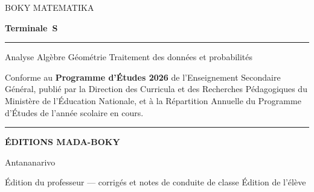 \cleardoublepage
\thispagestyle{empty}
\begingroup
\raggedright
\vspace*{3.2cm}

{\sffamily\fontsize{11}{14}\selectfont\color{bmtGris} BOKY MATEMATIKA\par}
\vspace{0.5em}
{\sffamily\bfseries\fontsize{40}{44}\selectfont\color{bmtIndigo} Terminale~S\par}
\vspace{0.9em}
{\color{bmtRaphia}\rule{4cm}{2.6pt}\par}
\vspace{1.4em}
{\sffamily\fontsize{13}{18}\selectfont
 Analyse \quad Algèbre \quad Géométrie \quad Traitement des données et probabilités\par}

\vspace{2.6cm}
{\normalsize
 Conforme au \textbf{Programme d'Études 2026} de l'Enseignement Secondaire
 Général, publié par la Direction des Curricula et des Recherches
 Pédagogiques du Ministère de l'Éducation Nationale, et à la Répartition
 Annuelle du Programme d'Études de l'année scolaire en cours.\par}

\vfill

{\color{bmtIndigo}\rule{1.4cm}{1.6pt}\par}
\vspace{0.5em}
{\sffamily\bfseries\fontsize{13}{17}\selectfont\color{bmtIndigo} ÉDITIONS MADA-BOKY\par}
\vspace{0.3em}
{\sffamily\footnotesize\color{bmtGris} Antananarivo\par}

\vspace{1.2em}
{\sffamily\footnotesize\color{bmtGris}
 \ifbmtprof Édition du professeur — corrigés et notes de conduite de classe
 \else Édition de l'élève\fi\par}
\endgroup
\cleardoublepage
